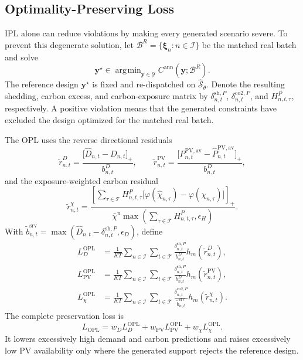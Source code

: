 \documentclass[times]{elsarticle}
\DeclareMathOperator*{\argmin}{\arg\!\min}
\begin{document}
\subsection{Optimality-Preserving Loss}

IPL alone can reduce violations by making every generated scenario severe. To
prevent this degenerate solution, let
$\mathcal B^R=\{\bm\xi_n:n\in\mathcal I\}$ be the matched real batch and solve
\begin{equation}
\bm y^\star\in\argmin_{\bm y\in\mathcal Y}
C^{\mathrm{ann}}(\bm y;\mathcal B^R).
\label{eq:pi_design}
\end{equation}
The reference design $\bm y^\star$ is fixed and re-dispatched on
$\widehat{\mathcal S}_\theta$. Denote the resulting shedding, carbon excess,
and carbon-exposure matrix by $\delta^{\mathrm{sh},P}_{n,t}$,
$\delta^{\mathrm{co2},P}_{n,t}$, and $H^P_{n,t,\tau}$, respectively. A positive violation
means that the generated constraints have excluded the design optimized for the
matched real batch.

The OPL uses the reverse directional residuals
\begin{equation}
\widetilde r^D_{n,t}=
\frac{\bigl[\widehat D_{n,t}-D_{n,t}\bigr]_+}{b^D_{n,t}},
\qquad
\widetilde r^{\mathrm{PV}}_{n,t}=
\frac{\bigl[P^{\mathrm{PV,av}}_{n,t}
-\widehat P^{\mathrm{PV,av}}_{n,t}\bigr]_+}
{b^D_{n,t}},
\label{eq:opl_directions}
\end{equation}
and the exposure-weighted carbon residual
\begin{equation}
\widetilde r^\chi_{n,t}=
\frac{\left[\sum_{\tau\in\mathcal T}H^P_{n,t,\tau}
\bigl[\varphi(\widehat\chi_{n,\tau})-\varphi(\chi_{n,\tau})\bigr]\right]_+}
{\bar\chi^{\mathrm n}\max(\sum_{\tau\in\mathcal T}H^P_{n,t,\tau},\epsilon_H)}.
\label{eq:opl_carbon_direction}
\end{equation}
With $\widetilde b^{\mathrm{srv}}_{n,t}=\max(\widehat D_{n,t}
-\delta^{\mathrm{sh},P}_{n,t},\epsilon_D)$, define
\begin{align}
L_D^{\mathrm{OPL}}&=\frac1{KT}\sum_{n\in\mathcal I}
\sum_{t\in\mathcal T}
\frac{\delta^{\mathrm{sh},P}_{n,t}}{b^D_{n,t}}
h_m(\widetilde r^D_{n,t}),
\label{eq:opl_load}\\
L_{\mathrm{PV}}^{\mathrm{OPL}}&=\frac1{KT}\sum_{n\in\mathcal I}
\sum_{t\in\mathcal T}
\frac{\delta^{\mathrm{sh},P}_{n,t}}{b^D_{n,t}}
h_m(\widetilde r^{\mathrm{PV}}_{n,t}),
\label{eq:opl_pv}\\
L_\chi^{\mathrm{OPL}}&=\frac1{KT}\sum_{n\in\mathcal I}
\sum_{t\in\mathcal T}
\frac{\delta^{\mathrm{co2},P}_{n,t}}{\widetilde b^{\mathrm{srv}}_{n,t}}
h_m(\widetilde r^\chi_{n,t}).
\label{eq:opl_carbon}
\end{align}
The complete preservation loss is
\begin{equation}
L_{\mathrm{OPL}}=w_D L_D^{\mathrm{OPL}}
+w_{\mathrm{PV}}L_{\mathrm{PV}}^{\mathrm{OPL}}
+w_\chi L_\chi^{\mathrm{OPL}}.
\label{eq:opl}
\end{equation}
It lowers excessively high demand and carbon predictions and raises
excessively low PV availability only where the generated support rejects the
reference design.
\end{document}
